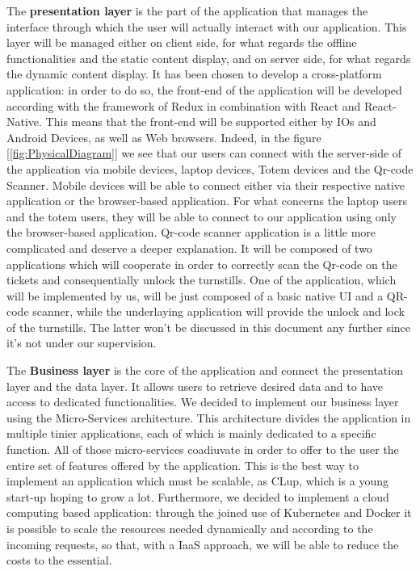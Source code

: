 The \textbf{presentation layer} is the part of the application that manages the interface through which the user will actually interact with our application. \newline
This layer will be managed either on client side, for what regards the offline functionalities and the static content display, and on server side, for what regards the dynamic content display. \newline
It has been chosen to develop a cross-platform application: in order to do so, the front-end of the application will be developed according with the framework of Redux in combination with React and React-Native.\newline
This means that the front-end will be supported either by IOs and Android Devices, as well as Web browsers.
Indeed, in the figure [\ref{fig:PhysicalDiagram}] we see that our users can connect with the server-side of the application via mobile devices, laptop devices, Totem devices and the Qr-code Scanner.\newline
Mobile devices will be able to connect either via their respective native application or the browser-based application.\newline
For what concerns the laptop users and the totem users, they will be able to connect to our application using only the browser-based application.\newline
Qr-code scanner application is a little more complicated and deserve a deeper explanation. It will be composed of two applications which will cooperate in order to correctly scan the Qr-code on the tickets and consequentially unlock the turnstills. One of the application, which will be implemented by us, will be just composed of a basic native UI and a QR-code scanner, while the underlaying application will provide the unlock and lock of the turnstills.\newline
The latter won't be discussed in this document any further since it's not under our supervision.

The \textbf{Business layer} is the core of the application and connect the presentation layer and the data layer. It allows users to retrieve desired data and to have access to dedicated functionalities. We decided to implement our business layer using the Micro-Services architecture. This architecture divides the application in multiple tinier applications, each of which is mainly dedicated to a specific function. All of those micro-services coadiuvate in order to offer to the user the entire set of features offered by the application. This is the best way to implement an application which must be scalable, as CLup, which is a young start-up hoping to grow a lot. Furthermore, we decided to implement a cloud computing based application: through the joined use of Kubernetes and Docker it is possible to scale the resources needed dynamically and according to the incoming requests, so that, with a IaaS approach, we will be able to reduce the costs to the essential.

